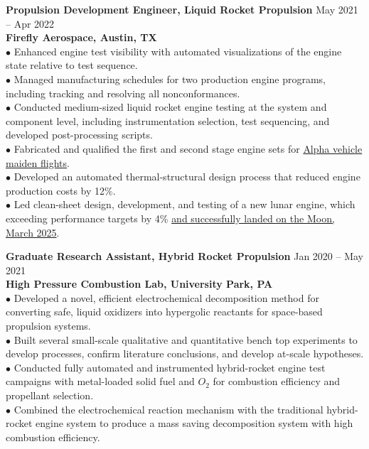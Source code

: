\documentclass[10pt]{article}
\newcommand{\blankline}{\quad\pagebreak[2]\vspace{-0.3\baselineskip}}
\begin{document}
\textbf{Propulsion Development Engineer, Liquid Rocket Propulsion}
\hfill May 2021 -- Apr 2022 \\
\textbf{Firefly Aerospace, Austin, TX} \\
$\bullet$ Enhanced engine test visibility with automated visualizations of the engine state relative to test sequence. \\
$\bullet$ Managed manufacturing schedules for two production engine programs, including tracking and resolving all nonconformances. \\ 
$\bullet$ Conducted medium-sized liquid rocket engine testing at the system and component level, including instrumentation selection, test sequencing, and developed post-processing scripts. \\ 
$\bullet$ Fabricated and qualified the first and second stage engine sets for \href{https://fireflyspace.com/news/firefly-aerospace-conducts-first-test-launch-of-alpha-launch-vehicle/}{Alpha vehicle maiden flights}. \\
$\bullet$ Developed an automated thermal-structural design process that reduced engine production costs by 12\%. \\
$\bullet$ Led clean-sheet design, development, and testing of a new lunar engine, which exceeding performance targets by 4\% \href{https://fireflyspace.com/missions/blue-ghost-mission-1/}{and successfully landed on the Moon, March 2025}.

\blankline

\textbf{Graduate Research Assistant, Hybrid Rocket Propulsion}
\hfill Jan 2020 -- May 2021 \\
\textbf{High Pressure Combustion Lab, University Park, PA} \\
$\bullet$ Developed a novel, efficient electrochemical decomposition method for converting safe, liquid oxidizers into hypergolic reactants for space-based propulsion systems. \\ 
$\bullet$ Built several small-scale qualitative and quantitative bench top experiments to develop processes, confirm literature conclusions, and develop at-scale hypotheses. \\
$\bullet$ Conducted fully automated and instrumented hybrid-rocket engine test campaigns with metal-loaded solid fuel and $O_2$ for combustion efficiency and propellant selection. \\ 
$\bullet$ Combined the electrochemical reaction mechanism with the traditional hybrid-rocket engine system to produce a mass saving decomposition system with high combustion efficiency.
\end{document}
